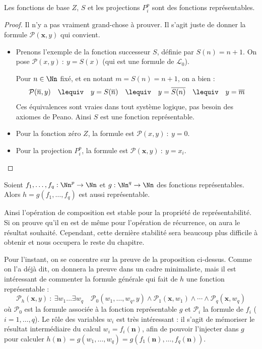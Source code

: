 \documentclass[11pt,class=report,crop=false]{standalone}
\begin{document}
\begin{proposition}
    Les fonctions de base $Z$, $S$ et les projections $P_i^p$ sont des fonctions représentables.
\end{proposition}

\begin{proof}
    Il n'y a pas vraiment grand-chose à prouver. Il s'agit juste de donner la formule $\mathcal{P}(\mathbf{x}, y)$ qui convient.
  \begin{itemize}  
    \item 
    Prenons l'exemple de la fonction successeur $S$, définie par $S(n) = n+1$.
    On pose $\mathcal{P}(x,y) \ : \ y = S(x)$ (qui est une formule de $\mathcal{L}_0$).
    
    Pour $n \in \Nn$ fixé, et en notant $m = S(n) = n+1$, on a bien :
    \[ \mathcal{P}(\overline{n}, y) \quad \lequiv \quad y = S(\overline{n}) \quad \lequiv \quad y = \overline{S(n)} \quad \lequiv \quad y = \overline{m} \]
Ces équivalences sont vraies dans tout système logique, pas besoin des axiomes de Peano.
    Ainsi $S$ est une fonction représentable.

\item Pour la fonction zéro $Z$, la formule est $\mathcal{P}(x,y) \ : \ y = 0$.
    \item Pour la projection $P_i^p$, la formule est $\mathcal{P}(\mathbf{x},y) \ : \ y = x_i$.
\end{itemize}
\end{proof}


\begin{proposition}
    Soient $f_1, \dots, f_q : \Nn^p \to \Nn$ et $g : \Nn^q \to \Nn$ des fonctions représentables. 
    Alors $h = g(f_1, \dots, f_q)$ est aussi représentable.
\end{proposition}

Ainsi l'opération de composition est stable pour la propriété de représentabilité. 
Si on prouve qu'il en est de même pour l'opération de récurrence, on aura le résultat souhaité. 
Cependant, cette dernière stabilité sera beaucoup plus difficile à obtenir et nous occupera le reste du chapitre.

Pour l'instant, on se concentre sur la preuve de la proposition ci-dessus. 
Comme on l'a déjà dit, on donnera la preuve dans un cadre minimaliste, mais
il est intéressant de commenter la formule générale qui fait de $h$ une fonction représentable : 
\[
\mathcal{P}_h(\mathbf{x},y) \ : \ \exists w_1 \dots \exists w_q \quad \mathcal{P}_0(w_1, \dots, w_q, y) \land \mathcal{P}_1(\mathbf{x}, w_1) \land \cdots \land \mathcal{P}_q(\mathbf{x}, w_q)
\]
où $\mathcal{P}_0$ est la formule associée à la fonction représentable $g$ et $\mathcal{P}_i$ la formule de $f_i$ ($i=1,\dots,q$).
Le rôle des variables $w_i$ est très intéressant : il s'agit de mémoriser le résultat intermédiaire du calcul $w_i = f_i(\mathbf{n})$, afin de pouvoir l'injecter dans $g$ pour calculer $h(\mathbf{n}) = g(w_1, \dots, w_q) = g(f_1(\mathbf{n}), \dots, f_q(\mathbf{n}))$.
\end{document}
